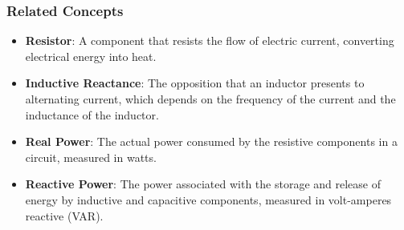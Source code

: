 \subsubsection{Related Concepts}
\begin{itemize}
    \item \textbf{Resistor}: A component that resists the flow of electric current, converting electrical energy into heat.
    \item \textbf{Inductive Reactance}: The opposition that an inductor presents to alternating current, which depends on the frequency of the current and the inductance of the inductor.
    \item \textbf{Real Power}: The actual power consumed by the resistive components in a circuit, measured in watts.
    \item \textbf{Reactive Power}: The power associated with the storage and release of energy by inductive and capacitive components, measured in volt-amperes reactive (VAR).
\end{itemize}

